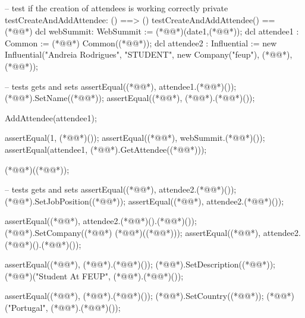 \begin{vdmpp}[breaklines=true]
 -- test if the creation of attendees is working correctly
 private testCreateAndAddAttendee: () ==> ()
 testCreateAndAddAttendee() == (*@\vdmnotcovered{(}@*)
  dcl webSummit: WebSummit := (*@@*)(date1,(*@@*));
  dcl attendee1 : Common := (*@@*) Common((*@@*));
  dcl attendee2 : Influential := new Influential("Andreia Rodrigues", "STUDENT", new Company("feup"), (*@@*), (*@@*));
  
  -- tests gets and sets
  assertEqual((*@@*), attendee1.(*@@*)());
  (*@@*).SetName((*@@*));
  assertEqual((*@@*), (*@@*).(*@@*)());
 
  AddAttendee(attendee1);
  
  assertEqual(1, (*@@*)());
  assertEqual({(*@@*)}, webSummit.(*@@*)());
  assertEqual(attendee1, (*@@*).GetAttendee((*@@*)));
  
  (*@@*)((*@@*));
  
  -- tests gets and sets
  assertEqual((*@@*), attendee2.(*@@*)());
  (*@@*).SetJobPosition((*@@*));
  assertEqual((*@@*), attendee2.(*@@*)());
  
  assertEqual((*@@*), attendee2.(*@@*)().(*@@*)());
  (*@@*).SetCompany((*@@*) (*@@*)((*@@*)));
  assertEqual((*@@*), attendee2.(*@@*)().(*@@*)());
  
  assertEqual((*@@*), (*@@*).(*@@*)());
  (*@@*).SetDescription((*@@*));
  (*@@*)("Student At FEUP", (*@@*).(*@@*)());
  
  assertEqual((*@@*), (*@@*).(*@@*)());
  (*@@*).SetCountry((*@@*));
  (*@@*)("Portugal", (*@@*).(*@@*)());
  

\end{vdmpp}
